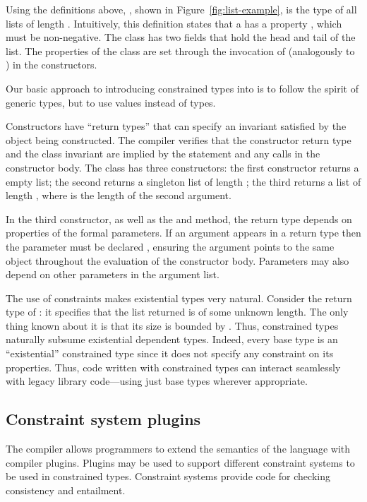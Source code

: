 Using the definitions above, , shown in
Figure~\ref{fig:list-example}, is the type of all lists of
length .
%
Intuitively, this definition states that a  has a 
property , which must be non-negative.  The class has two
fields that hold the head and tail of the list.  The properties
of the
class are set through the invocation of \tcd{(\ldots)}
(analogously to \tcd{(\ldots)}) in the constructors.

Our basic approach to introducing constrained types into \Xten{}
is to follow the spirit of generic types, but to use values
instead of types.

Constructors have ``return
types'' that can specify an invariant satisfied by the object being
constructed.  The compiler verifies that the
constructor return type and the class invariant are implied by the
 statement and any  calls in the constructor
body.
The  class has three constructors: the first
constructor returns a empty list; the second returns 
a singleton list of length ; the third
returns a list of length , where  is
the length of the second argument.

In the third constructor, as well as 
the  and  method, the return type
depends on properties of the formal parameters. 
If an argument appears in a
return type then the parameter must be declared ,
ensuring the
argument points to the same object throughout the evaluation of
the constructor body.  Parameters may also depend on other 
parameters in the argument list.

The use of constraints makes existential types very natural.
Consider the return type of : it specifies
that the list returned is of some unknown length. The only thing
known about it is that its size is bounded by .
Thus,
constrained types naturally subsume existential dependent types.
Indeed, every base type  is an ``existential''
constrained type since it does not specify any constraint on its
properties. Thus, code written with constrained types can
interact seamlessly with legacy library code---using just base
types wherever appropriate.


\subsection{Constraint system plugins}

The \Xten{} compiler allows  
programmers to extend the semantics of the language with
compiler plugins.  Plugins may be used to support different constraint
systems to be used in constrained types.
Constraint systems provide code for checking consistency and
entailment.

